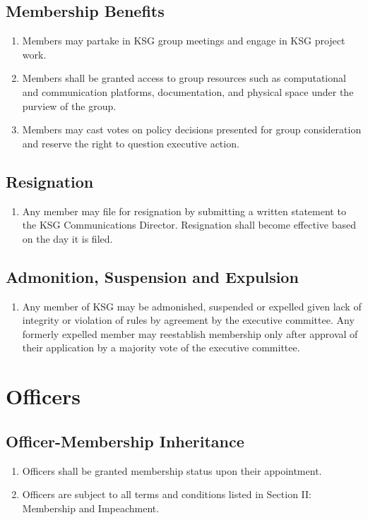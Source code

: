 \documentclass[12pt,executivepaper]{article}
\begin{document}
\subsection{Membership Benefits}
\begin{enumerate}
    \item Members may partake in KSG group meetings and engage in KSG project work.
    \item Members shall be granted access to group resources such as computational
          and communication platforms, documentation, and physical space under the
          purview of the group.
    \item Members may cast votes on policy decisions presented for group consideration
          and reserve the right to question executive action.
\end{enumerate}

\subsection{Resignation}
\begin{enumerate}
    \item Any member may file for resignation by submitting a written statement to
          the KSG Communications Director. Resignation shall become effective based
          on the day it is filed.
\end{enumerate}

\subsection{Admonition, Suspension and Expulsion}
\begin{enumerate}
    \item Any member of KSG may be admonished, suspended or expelled given lack of
          integrity or violation of rules by agreement by the executive committee.
          Any formerly expelled member may reestablish membership only after approval
          of their application by a majority vote of the executive committee.
\end{enumerate}

\section{Officers}

\subsection{Officer-Membership Inheritance}
\begin{enumerate}
    \item Officers shall be granted membership status upon their appointment.
    \item Officers are subject to all terms and conditions listed in Section II:
          Membership and Impeachment.
\end{enumerate}
\end{document}
